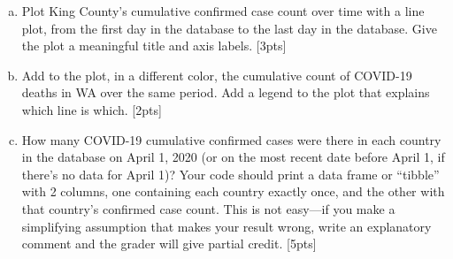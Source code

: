 \documentclass[12pt]{article}
\begin{document}
\begin{enumerate}[(a)]
	\item Plot King County's cumulative confirmed case count over time with a line plot, from the first day in the database to the last day in the database. Give the plot a meaningful title and axis labels. [3pts]
	\item Add to the plot, in a different color, the cumulative count of COVID-19 deaths in WA over the same period. Add a legend to the plot that explains which line is which. [2pts]
	\item How many COVID-19 cumulative confirmed cases were there in each country in the database on April 1, 2020 (or on the most recent date before April 1, if there's no data for April 1)? Your code should print a data frame or ``tibble'' with 2 columns, one containing each country exactly once, and the other with that country's confirmed case count. This is not easy---if you make a simplifying assumption that makes your result wrong, write an explanatory comment and the grader will give partial credit. [5pts]
\end{enumerate}
\end{document}
